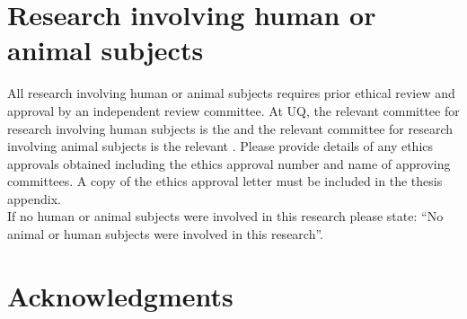 



\pagebreak





\section*{Research involving human or animal subjects}

\begin{instructional}
	All research involving human or animal subjects requires prior ethical review and approval by an independent review committee. At UQ, the relevant committee for research involving human subjects is the \href{http://www.uq.edu.au/research/integrity-compliance/human-ethics}{\color{blue}{Human Ethics Unit}} and the relevant committee for research involving animal subjects is the relevant \href{http://www.uq.edu.au/research/integrity-compliance/animal-welfare}{\color{blue}{Animal Ethics Committee}}.  Please provide details of any ethics approvals obtained including the ethics approval number and name of approving committees.  A copy of the ethics approval letter must be included in the thesis appendix.\\
    
    \noindent
	If no human or animal subjects were involved in this research please state: ``No animal or human subjects were involved in this research''.
\end{instructional}





\clearpage
\section*{Acknowledgments}


